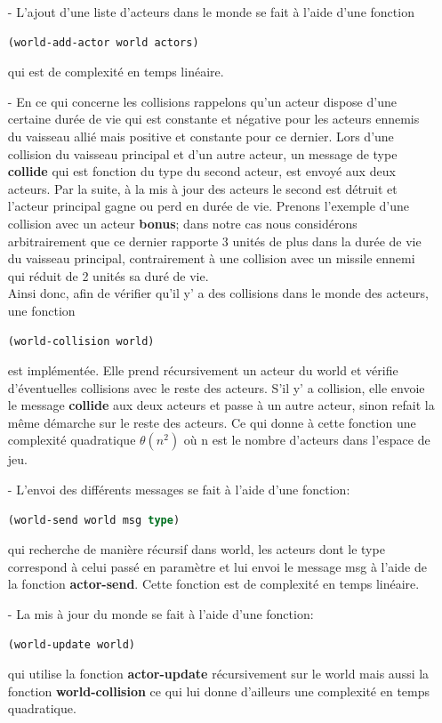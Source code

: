 \begin{itemize}

    \item[\huge -]L'ajout d'une liste d'acteurs dans le monde se fait à l'aide d'une fonction
    \begin{lstlisting}[language={lisp},captionpos=b, frame=single]
    (world-add-actor world actors)
    \end{lstlisting}
    qui est de complexité en temps linéaire.
    
    \item[\huge -] En ce qui concerne les collisions rappelons qu'un acteur dispose d'une certaine durée de vie qui est constante et négative pour les acteurs ennemis du vaisseau allié mais positive et constante pour ce dernier. 
    Lors d'une collision du vaisseau principal et d'un autre acteur, un message de type \textbf{collide} qui est fonction du type du second acteur, est envoyé aux deux acteurs. Par la suite, à la mis à jour des acteurs le second est détruit et l'acteur principal gagne ou perd en durée de vie.
    Prenons l'exemple d'une collision avec un acteur \textbf{bonus}; dans notre cas nous considérons arbitrairement que ce dernier rapporte 3 unités de plus dans la durée de vie du vaisseau principal, contrairement à une collision avec un missile ennemi qui réduit de 2 unités sa duré de vie. \\
     Ainsi donc, afin de vérifier qu'il y' a des collisions dans le monde des acteurs, une fonction
    \begin{lstlisting}[language={lisp},captionpos=b, frame=single]
    (world-collision world)
    \end{lstlisting}    
    est implémentée. Elle prend récursivement un acteur du world et vérifie d'éventuelles collisions avec le reste des acteurs. S'il y' a collision, elle envoie le message \textbf{collide} aux deux acteurs et passe à un autre acteur, sinon refait la même démarche sur le reste des acteurs. Ce qui donne à cette fonction une complexité quadratique \textbf{$\theta (n^2)$} où n est le nombre d'acteurs dans l'espace de jeu.

    \item[\huge -] L'envoi des différents messages se fait à l'aide d'une fonction:
    \begin{lstlisting}[language={lisp},captionpos=b, frame=single]
    (world-send world msg type)
    \end{lstlisting}
    qui recherche de manière récursif dans world, les acteurs dont le type correspond à celui passé en paramètre et lui envoi le message msg à l'aide de la fonction \textbf{actor-send}. Cette fonction est de complexité en temps linéaire.
    
    \item[\huge -] La mis à jour du monde se fait à l'aide d'une fonction:
    \begin{lstlisting}[language={lisp},captionpos=b, frame=single]
    (world-update world)
    \end{lstlisting}
    qui utilise la fonction \textbf{actor-update} récursivement sur le world mais aussi la fonction \textbf{world-collision} ce qui lui donne d'ailleurs une complexité en temps quadratique.
\end{itemize}
